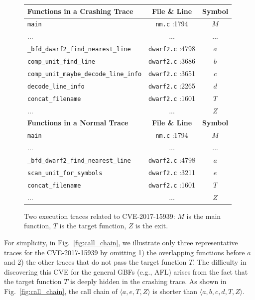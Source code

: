 \begin{figure}[t]
	\centering
	\small \begin{tabular}{lcc}
		\hline
  \textbf{Functions in a Crashing Trace} &  	\textbf{File \& Line} & \textbf{Symbol} \\\hline
  	 \texttt{main}   &   \texttt{nm.c} :1794     & \textsf{$M$}\\
 	   ... &  ...  &...  \\
 	 \texttt{\_bfd\_dwarf2\_find\_nearest\_line}     &   \texttt{dwarf2.c} :4798   &  \textsf{$a$}\\
 	 \texttt{comp\_unit\_find\_line}    &   \texttt{dwarf2.c} :3686    & \textsf{$b$}\\
 	 \texttt{comp\_unit\_maybe\_decode\_line\_info} &	 \texttt{dwarf2.c} :3651       &  \textsf{$c$}\\
  	 \texttt{decode\_line\_info}   &    \texttt{dwarf2.c} :2265     &  \textsf{$d$} \\
\texttt{concat\_filename}   &   \texttt{dwarf2.c} :1601     &  \textsf{$T$}\\
    ... 	 	  &     ... 	  &  \textsf{$Z$}\\\hline
	  \textbf{Functions in a Normal Trace} &  	\textbf{File \& Line} & \textbf{Symbol} \\\hline
	   \texttt{main}   &   \texttt{nm.c} :1794     &  \textsf{$M$}\\
	      ... &  ...  &...  \\
	   \texttt{\_bfd\_dwarf2\_find\_nearest\_line}     & \texttt{dwarf2.c} :4798      & \textsf{$a$}\\
	  \texttt{scan\_unit\_for\_symbols}    &      \texttt{dwarf2.c} :3211        &  \textsf{$e$}\\
  \texttt{concat\_filename}   &  \texttt{dwarf2.c} :1601      &  \textsf{$T$}\\
	    ... 	 	  &     ...       & \textsf{$Z$}\\\hline
	\end{tabular}
\vspace{-5pt}
	\caption{Two execution traces related to CVE-2017-15939: $M$ is the main function, $T$ is the target function, $Z$ is the exit.}
	\label{fig:exam_trace}
\end{figure}



For simplicity, in Fig.~\ref{fig:call_chain}, we illustrate only three representative traces for the CVE-2017-15939 by omitting 1) the overlapping functions before $a$ and 2) the other traces that do not pass the target function $T$. {The difficulty in discovering this CVE for the general GBFs (e.g., AFL) arises from the fact that the target function $T$ is deeply hidden in the crashing trace.} As shown in Fig.~\ref{fig:call_chain}, the call chain of $\langle a, e, T, Z\rangle$ is shorter than $\langle a, b, c, d, T, Z\rangle$.

